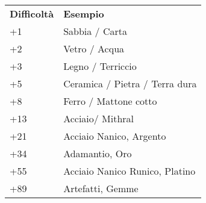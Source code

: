 \documentclass[a4paper,twoside,openany]{book}
\begin{document}
\begin{multicols}{2}
\medskip
\begin{tabular}{ll}
	\toprule
	\textbf{Difficoltà}	&  \textbf{Esempio}\\
	+1                  &  Sabbia / Carta \\
	+2                  &  Vetro / Acqua\\
	+3                  &  Legno / Terriccio\\
	+5                  &  Ceramica / Pietra / Terra dura\\
	+8                  &  Ferro / Mattone cotto\\
	+13                 &  Acciaio/ Mithral\\
	+21                 &  Acciaio Nanico, Argento\\
	+34                 &  Adamantio, Oro\\
	+55                 &  Acciaio Nanico Runico, Platino\\
	+89                 &  Artefatti, Gemme\\
\end{tabular}




\end{multicols}
\end{document}

